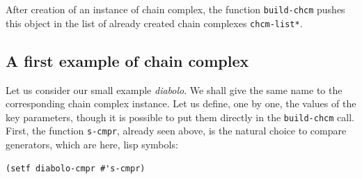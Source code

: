 After creation of an instance of chain complex, the function {\tt build-chcm} pushes this
object in the list of already created chain complexes {\tt *chcm-list*}.

\subsection* {A first example of chain complex}

Let us consider our small example {\em diabolo}. We shall give the same name to  
the corresponding chain complex  instance. 
Let us define, one by one, the values of the key parameters, 
though it is possible to put them directly in the {\tt build-chcm} call. 
First,  the function {\tt s-cmpr}, already seen above, is  the natural choice to compare
generators, which are here, lisp symbols:
{\footnotesize\begin{verbatim}
(setf diabolo-cmpr #'s-cmpr)   
\end{verbatim}}


